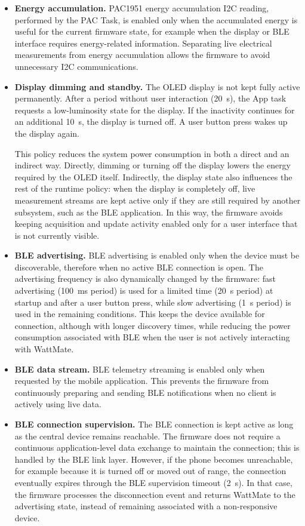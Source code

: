 \begin{itemize}
	\item \textbf{Energy accumulation.}
	PAC1951 energy accumulation I2C reading, performed by the PAC Task, is enabled only when the accumulated energy is useful for the current firmware state, for example when the display or BLE interface requires energy-related information. Separating live electrical measurements from energy accumulation allows the firmware to avoid unnecessary I2C communications.
	
	\item \textbf{Display dimming and standby.}
	The OLED display is not kept fully active permanently. After a period without user interaction (\SI{20}{s}), the App task requests a low-luminosity state for the display. If the inactivity continues for an additional \SI{10}{s}, the display is turned off. A user button press wakes up the display again.
	
	This policy reduces the system power consumption in both a direct and an indirect way. Directly, dimming or turning off the display lowers the energy required by the OLED itself. Indirectly, the display state also influences the rest of the runtime policy: when the display is completely off, live measurement streams are kept active only if they are still required by another subsystem, such as the BLE application. In this way, the firmware avoids keeping acquisition and update activity enabled only for a user interface that is not currently visible.
	
	
	
	\item \textbf{BLE advertising.}
	BLE advertising is enabled only when the device must be discoverable, therefore when no active BLE connection is open. The advertising frequency is also dynamically changed by the firmware: fast advertising (\SI{100}{ms} period) is used for a limited time (\SI{20}{s} period) at startup and after a user button press, while slow advertising (\SI{1}{s} period) is used in the remaining conditions. This keeps the device available for connection, although with longer discovery times, while reducing the power consumption associated with BLE when the user is not actively interacting with WattMate.
	
	\item \textbf{BLE data stream.}
	BLE telemetry streaming is enabled only when requested by the mobile application. This prevents the firmware from continuously preparing and sending BLE notifications when no client is actively using live data.
	
	\item \textbf{BLE connection supervision.}
	The BLE connection is kept active as long as the central device remains reachable. The firmware does not require a continuous application-level data exchange to maintain the connection; this is handled by the BLE link layer. However, if the phone becomes unreachable, for example because it is turned off or moved out of range, the connection eventually expires through the BLE supervision timeout (\SI{2}{s}). In that case, the firmware processes the disconnection event and returns WattMate to the advertising state, instead of remaining associated with a non-responsive device.
	

\end{itemize}
